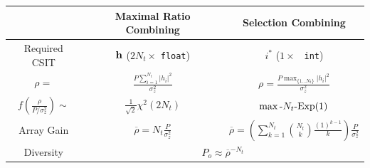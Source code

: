 \documentclass[xcolor=dvipsnames,aspectratio=169]{beamer}
\begin{document}
{\begin{table}
  \begin{tabular}{c|c|c}
   &Maximal Ratio Combining& Selection Combining\\\hline
   Required CSIT & $\mathbf{h}$ ($2N_{t}\times$ \texttt{\color{KYJade}float}) & $i^*$ ($1\times$ \texttt{\color{KYJade} int})\\
   $\rho=$&$\frac{P\sum_{i=1}^{N_{t}}|h_i|^2}{\sigma_z^2}$& $\rho=\frac{ P\max_{\{1\dots N_{t}\}} |h_i|^2}{\sigma_z^2}$\\
   $f(\frac{\rho}{P/\sigma_z^2})\sim$&$\frac{1}{\sqrt{2}}\chi^2(2N_{t})$& $\max\textnormal{-}N_{t}\textnormal{-}\textnormal{Exp}(1)$\\
   Array Gain&$\overline{\rho}=N_{t}\frac{P}{\sigma_z^2}$& $\overline{\rho}=\left(\sum_{k=1}^{N_{t}}{N_{t} \choose k}\frac{(1)^{k-1}}{k}\right)\frac{P}{\sigma_z^2}$\\\hline
   Diversity& \multicolumn{2}{c}{$P_o\approx\overline{\rho}^{-N_{t}}$}
  \end{tabular}
\end{table}
}
\end{document}
